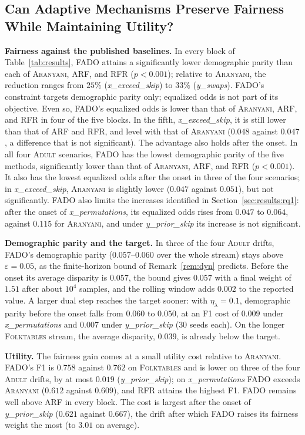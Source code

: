 \documentclass[conference]{IEEEtran}
\newcommand{\fado}{\textsc{FADO}}
\newcommand{\ara}{\textsc{Aranyani}}
\newcommand{\arf}{\textsc{ARF}}
\newcommand{\rfr}{\textsc{RFR}}
\newcommand{\adult}{\textsc{Adult}}
\newcommand{\folk}{\textsc{Folktables}}
\newcommand{\rev}[1]{{\color{blue}#1}}
\renewcommand{\rev}[1]{#1}
\begin{document}
\subsection{Can Adaptive Mechanisms Preserve Fairness While Maintaining Utility?}
\label{sec:results:rq2}
\textbf{Fairness against the published baselines.} In every block of Table~\ref{tab:results}, \fado{} attains a significantly lower demographic parity than
each of \ara{}, \arf{}, and \rfr{} ($p<0.001$); relative to \ara{}, the reduction ranges from $25\%$ (\emph{x\_exceed\_skip}) to $33\%$ (\emph{y\_swaps}). \fado{}'s
constraint targets demographic parity only; equalized odds is not part of its objective. Even so, \fado{}'s equalized odds is lower than that of \ara{},
\arf{}, and \rfr{} in four of the five blocks. In the fifth, \emph{x\_exceed\_skip}, it is still lower than that of \arf{} and \rfr{}, and level with
that of \ara{} ($0.048$ against $0.047$, a difference that is not significant).
The advantage also holds after the onset. In all four \adult{} scenarios, \fado{} has the lowest demographic parity of the five methods, significantly
lower than that of \ara{}, \arf{}, and \rfr{} ($p<0.001$). It also has the lowest equalized odds after the onset in three of the four scenarios; in
\emph{x\_exceed\_skip}, \ara{} is slightly lower ($0.047$ against $0.051$), but not significantly.
\fado{} also limits the increases identified in Section~\ref{sec:results:rq1}: after the onset of \emph{x\_permutations}, its equalized odds rises from $0.047$ to
$0.064$, against $0.115$ for \ara{}, and under \emph{y\_prior\_skip} its increase is not significant.

\rev{\textbf{Demographic parity and the target.} In three of the four \adult{} drifts, \fado{}'s demographic parity ($0.057$--$0.060$ over the whole stream)
stays above $\varepsilon=0.05$, as the finite-horizon bound of Remark~\ref{rem:dyn} predicts. Before the onset its average disparity is $0.057$, the bound gives
$0.057$ with a final weight of $1.51$ after about $10^4$ samples, and the rolling window adds $0.002$ to the reported value. A larger dual step reaches the target
sooner: with $\eta_\lambda=0.1$, demographic parity before the onset falls from $0.060$ to $0.050$, at an F1 cost of $0.009$ under \emph{x\_permutations} and
$0.007$ under \emph{y\_prior\_skip} ($30$ seeds each). On the longer \folk{} stream, the average disparity, $0.039$, is already below the target.}

\textbf{Utility.} The fairness gain comes at a small utility cost relative to \ara{}. \fado{}'s F1 is $0.758$ against $0.762$ on \folk{} and is lower on three of
the four \adult{} drifts, by at most $0.019$ (\emph{y\_prior\_skip}); on \emph{x\_permutations} \fado{} exceeds \ara{} ($0.612$ against $0.609$), and \rfr{} attains the highest F1. \fado{}
remains well above \arf{} in every block. The cost is largest after the onset of \emph{y\_prior\_skip} ($0.621$ against $0.667$), the drift after which
\fado{} raises its fairness weight the most (to $3.01$ on average).
\end{document}
